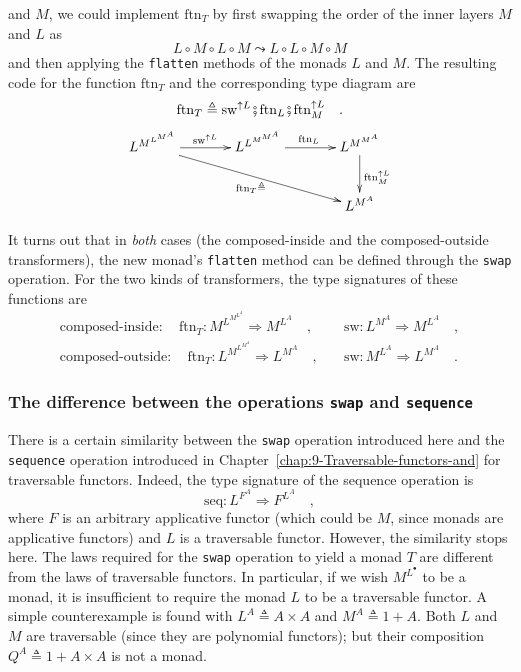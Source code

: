 and $M$, we could implement $\text{ftn}_{T}$ by first swapping the
order of the inner layers $M$ and $L$ as 
\[
L\circ M\circ L\circ M\leadsto L\circ L\circ M\circ M
\]
and then applying the \texttt{}\lstinline!flatten!
methods of the monads $L$ and $M$. The resulting code for the function
$\text{ftn}_{T}$ and the corresponding type diagram are
\begin{equation}
\text{ftn}_{T}\triangleq\text{sw}^{\uparrow L}\bef\text{ftn}_{L}\bef\text{ftn}_{M}^{\uparrow L}\quad.\label{eq:define-flatten-via-swap}
\end{equation}
\[
\xymatrix{\xyScaleY{2pc}\xyScaleX{3pc}L^{M^{L^{M^{A}}}}\ar[r]\sp(0.5){\text{sw}^{\uparrow L}}\ar[rrd]\sb(0.5){\text{ftn}_{T}\triangleq} & L^{L^{M^{M^{A}}}}\ar[r]\sp(0.5){\text{ftn}_{L}} & L^{M^{M^{A}}}\ar[d]\sp(0.5){\text{ftn}_{M}^{\uparrow L}}\\
 &  & L^{M^{A}}
}
\]

It turns out that in \emph{both} cases (the composed-inside and the
composed-outside transformers), the new monad's \texttt{}\lstinline!flatten!
method can be defined through the \texttt{}\lstinline!swap!
operation. For the two kinds of transformers, the type signatures
of these functions are
\begin{align*}
\text{composed-inside}:\quad\text{ftn}_{T}:M^{L^{M^{L^{A}}}}\Rightarrow M^{L^{A}}\quad, & \quad\text{sw}:L^{M^{A}}\Rightarrow M^{L^{A}}\quad,\\
\text{composed-outside}:\quad\text{ftn}_{T}:L^{M^{L^{M^{A}}}}\Rightarrow L^{M^{A}}\quad, & \quad\text{sw}:M^{L^{A}}\Rightarrow L^{M^{A}}\quad.
\end{align*}


\subsubsection{The difference between the operations \lstinline!swap!
and \lstinline!sequence!}

There is a certain similarity between the \texttt{}\lstinline!swap!
operation introduced here and the \lstinline!sequence!
operation introduced in Chapter~\ref{chap:9-Traversable-functors-and}
for traversable functors. Indeed, the type signature of the sequence
operation is 
\[
\text{seq}:L^{F^{A}}\Rightarrow F^{L^{A}}\quad,
\]
where $F$ is an arbitrary applicative functor (which could be $M$,
since monads are applicative functors) and $L$ is a traversable functor.
However, the similarity stops here. The laws required for the \texttt{}\lstinline!swap!
operation to yield a monad $T$ are different from the laws of traversable
functors. In particular, if we wish $M^{L^{\bullet}}$ to be a monad,
it is insufficient to require the monad $L$ to be a traversable functor.
A simple counterexample is found with $L^{A}\triangleq A\times A$
and $M^{A}\triangleq1+A$. Both $L$ and $M$ are traversable (since
they are polynomial functors); but their composition $Q^{A}\triangleq1+A\times A$
is not a monad.


